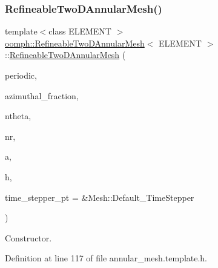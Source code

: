 \subsubsection{\texorpdfstring{Refineable\+Two\+D\+Annular\+Mesh()}{RefineableTwoDAnnularMesh()}\hspace{0.1cm}{\footnotesize\ttfamily [1/2]}}
{\footnotesize\ttfamily template$<$class E\+L\+E\+M\+E\+NT $>$ \\
\hyperlink{classoomph_1_1RefineableTwoDAnnularMesh}{oomph\+::\+Refineable\+Two\+D\+Annular\+Mesh}$<$ E\+L\+E\+M\+E\+NT $>$\+::\hyperlink{classoomph_1_1RefineableTwoDAnnularMesh}{Refineable\+Two\+D\+Annular\+Mesh} (\begin{DoxyParamCaption}\item[{const bool \&}]{periodic,  }\item[{const double \&}]{azimuthal\+\_\+fraction,  }\item[{const unsigned \&}]{ntheta,  }\item[{const unsigned \&}]{nr,  }\item[{const double \&}]{a,  }\item[{const double \&}]{h,  }\item[{Time\+Stepper $\ast$}]{time\+\_\+stepper\+\_\+pt = {\ttfamily \&Mesh\+:\+:Default\+\_\+TimeStepper} }\end{DoxyParamCaption})\hspace{0.3cm}{\ttfamily [inline]}}



Constructor. 



Definition at line 117 of file annular\+\_\+mesh.\+template.\+h.

\mbox{\label{classoomph_1_1RefineableTwoDAnnularMesh_a5efdb906168255f7264ee22a963d7eb6}} 
